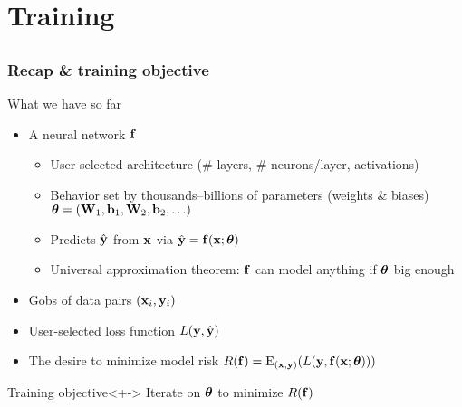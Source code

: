 \section{Training}

\subsection{}

\begin{frame}
    \frametitle{Recap \& training objective}

    What we have so far
    \begin{itemize}
        \item<+-> A neural network $\mathbf{f}$
        \begin{itemize}
            \item User-selected \alert{architecture} (\# layers, \# neurons/layer, activations)
            \item Behavior set by thousands--billions of \alert{parameters} (weights \& biases) $\bm{\theta} = (\mathbf{W}_1, \mathbf{b}_1, \mathbf{W}_2, \mathbf{b}_2, \ldots)$
            \item \alert{Predicts} $\hat{\mathbf{y}}$ from $\mathbf{x}$ via $\hat{\mathbf{y}} = \mathbf{f}(\mathbf{x}; \bm{\theta})$
            \item \alert{Universal approximation theorem}: $\mathbf{f}$ can model anything if $\bm{\theta}$ big enough
        \end{itemize}
        \item<+-> Gobs of \alert{data} pairs $(\mathbf{x}_i, \mathbf{y}_i)$
        \item<+-> User-selected \alert{loss function} $L(\mathbf{y}, \hat{\mathbf{y}})$
        \item<+-> The desire to minimize \alert{model risk} $R(\mathbf{f}) = \operatorname{\mathrm{E}}_{(\mathbf{x}, \mathbf{y})}(L(\mathbf{y}, \mathbf{f}(\mathbf{x}; \bm{\theta})))$
    \end{itemize}

    \begin{block}{Training objective}<+->
        Iterate on $\bm{\theta}$ to minimize $R(\mathbf{f})$
    \end{block}
\end{frame}

